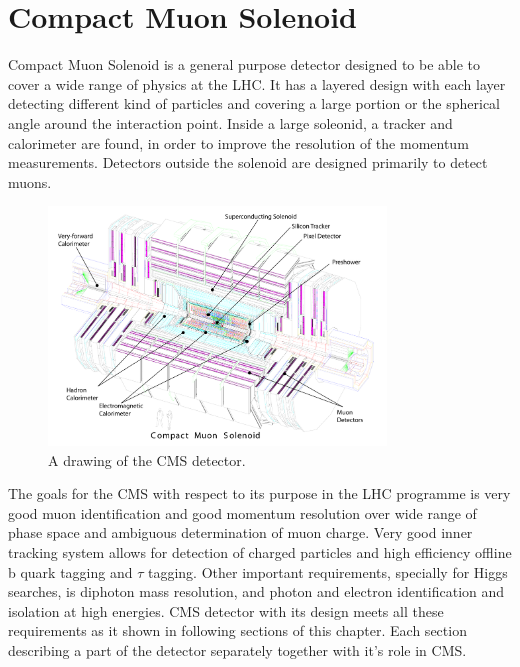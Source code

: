 \chapter{Compact Muon Solenoid} %

\label{Chapter4} %


Compact Muon Solenoid is a general purpose detector designed to be able to cover a wide range of physics at the LHC. It has a layered design with each layer detecting different kind of particles and covering a large portion or the spherical angle around the interaction point. Inside a large soleonid, a tracker and calorimeter are found, in order to improve the resolution of the momentum measurements. Detectors outside the solenoid are designed primarily to detect muons.  \\

\begin{figure}[htbp]
	\centering
		\includegraphics[width=0.8\textwidth]{Figures/CMS.pdf}
	\caption[CMS detector]{A drawing of the CMS detector. \cite{Chatrchyan:2008aa}}
	\label{fig:CMS}
\end{figure}
\par The goals for the CMS with respect to its purpose in the LHC programme is very good muon identification and good momentum resolution over wide range of phase space and ambiguous determination of muon charge. Very good inner tracking system allows for detection of charged particles and high efficiency offline b quark tagging and $\tau$ tagging. Other important requirements, specially for Higgs searches, is diphoton mass resolution, and photon and electron identification and isolation at high energies. 
CMS detector with its design meets all these requirements as it shown in following sections of this chapter.  Each section describing a part of the detector separately together with it's role in CMS.  

